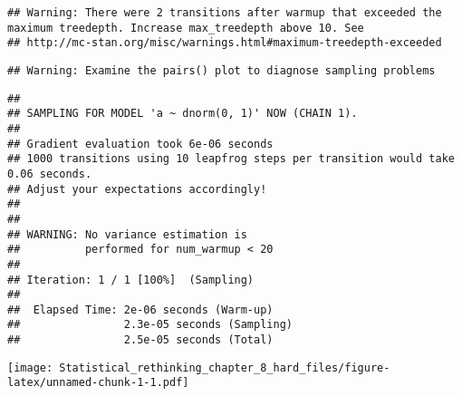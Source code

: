 \documentclass[]{article}
\newenvironment{Shaded}{\begin{snugshade}}{\end{snugshade}}
\newcommand{\KeywordTok}[1]{\textcolor[rgb]{0.13,0.29,0.53}{\textbf{#1}}}
\newcommand{\DataTypeTok}[1]{\textcolor[rgb]{0.13,0.29,0.53}{#1}}
\newcommand{\DecValTok}[1]{\textcolor[rgb]{0.00,0.00,0.81}{#1}}
\newcommand{\StringTok}[1]{\textcolor[rgb]{0.31,0.60,0.02}{#1}}
\newcommand{\CommentTok}[1]{\textcolor[rgb]{0.56,0.35,0.01}{\textit{#1}}}
\newcommand{\OperatorTok}[1]{\textcolor[rgb]{0.81,0.36,0.00}{\textbf{#1}}}
\newcommand{\NormalTok}[1]{#1}
\begin{document}
\begin{verbatim}
## Warning: There were 2 transitions after warmup that exceeded the maximum treedepth. Increase max_treedepth above 10. See
## http://mc-stan.org/misc/warnings.html#maximum-treedepth-exceeded
\end{verbatim}

\begin{verbatim}
## Warning: Examine the pairs() plot to diagnose sampling problems
\end{verbatim}

\begin{verbatim}
## 
## SAMPLING FOR MODEL 'a ~ dnorm(0, 1)' NOW (CHAIN 1).
## 
## Gradient evaluation took 6e-06 seconds
## 1000 transitions using 10 leapfrog steps per transition would take 0.06 seconds.
## Adjust your expectations accordingly!
## 
## 
## WARNING: No variance estimation is
##          performed for num_warmup < 20
## 
## Iteration: 1 / 1 [100%]  (Sampling)
## 
##  Elapsed Time: 2e-06 seconds (Warm-up)
##                2.3e-05 seconds (Sampling)
##                2.5e-05 seconds (Total)
\end{verbatim}

\begin{Shaded}
\end{Shaded}

\texttt{[image: Statistical\_rethinking\_chapter\_8\_hard\_files/figure-latex/unnamed-chunk-1-1.pdf]}
\end{document}
